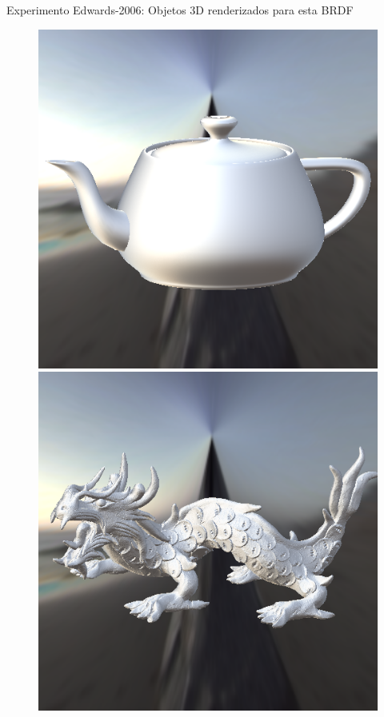 \begin{frame}{Experimento Edwards-2006: Objetos 3D renderizados para esta BRDF}
\begin{figure}[H]
    \label{fig-edwards-2006-eqlang}
  \includegraphics[width=\linewidth]{./Imagens/brdfs/edwards-2006-teapot.png}
\endminipage\hfill
{}
  \includegraphics[width=\linewidth]{./Imagens/brdfs/edwards-2006-dragon.png}

\end{figure}
\end{frame}
